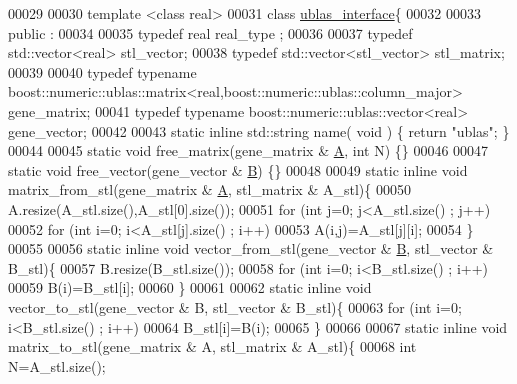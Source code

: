 \begin{DoxyCode}
00029 
00030 \textcolor{keyword}{template} <\textcolor{keyword}{class} real>
00031 \textcolor{keyword}{class }\hyperlink{classublas__interface}{ublas\_interface}\{
00032 
00033 public :
00034 
00035   \textcolor{keyword}{typedef} real real\_type ;
00036 
00037   \textcolor{keyword}{typedef} std::vector<real> stl\_vector;
00038   \textcolor{keyword}{typedef} std::vector<stl\_vector> stl\_matrix;
00039 
00040   \textcolor{keyword}{typedef} \textcolor{keyword}{typename} boost::numeric::ublas::matrix<real,boost::numeric::ublas::column\_major> gene\_matrix;
00041   \textcolor{keyword}{typedef} \textcolor{keyword}{typename} boost::numeric::ublas::vector<real> gene\_vector;
00042 
00043   \textcolor{keyword}{static} \textcolor{keyword}{inline} std::string name( \textcolor{keywordtype}{void} ) \{ \textcolor{keywordflow}{return} \textcolor{stringliteral}{"ublas"}; \}
00044 
00045   \textcolor{keyword}{static} \textcolor{keywordtype}{void} free\_matrix(gene\_matrix & \hyperlink{group___core___module_class_eigen_1_1_matrix}{A}, \textcolor{keywordtype}{int} N) \{\}
00046 
00047   \textcolor{keyword}{static} \textcolor{keywordtype}{void} free\_vector(gene\_vector & \hyperlink{group___core___module_class_eigen_1_1_matrix}{B}) \{\}
00048 
00049   \textcolor{keyword}{static} \textcolor{keyword}{inline} \textcolor{keywordtype}{void} matrix\_from\_stl(gene\_matrix & \hyperlink{group___core___module_class_eigen_1_1_matrix}{A}, stl\_matrix & A\_stl)\{
00050     A.resize(A\_stl.size(),A\_stl[0].size());
00051     \textcolor{keywordflow}{for} (\textcolor{keywordtype}{int} j=0; j<A\_stl.size() ; j++)
00052       \textcolor{keywordflow}{for} (\textcolor{keywordtype}{int} i=0; i<A\_stl[j].size() ; i++)
00053         A(i,j)=A\_stl[j][i];
00054   \}
00055 
00056   \textcolor{keyword}{static} \textcolor{keyword}{inline} \textcolor{keywordtype}{void} vector\_from\_stl(gene\_vector & \hyperlink{group___core___module_class_eigen_1_1_matrix}{B}, stl\_vector & B\_stl)\{
00057     B.resize(B\_stl.size());
00058     \textcolor{keywordflow}{for} (\textcolor{keywordtype}{int} i=0; i<B\_stl.size() ; i++)
00059       B(i)=B\_stl[i];
00060   \}
00061 
00062   \textcolor{keyword}{static} \textcolor{keyword}{inline} \textcolor{keywordtype}{void} vector\_to\_stl(gene\_vector & B, stl\_vector & B\_stl)\{
00063     \textcolor{keywordflow}{for} (\textcolor{keywordtype}{int} i=0; i<B\_stl.size() ; i++)
00064       B\_stl[i]=B(i);
00065   \}
00066 
00067   \textcolor{keyword}{static} \textcolor{keyword}{inline} \textcolor{keywordtype}{void} matrix\_to\_stl(gene\_matrix & A, stl\_matrix & A\_stl)\{
00068     \textcolor{keywordtype}{int} N=A\_stl.size();

\end{DoxyCode}
